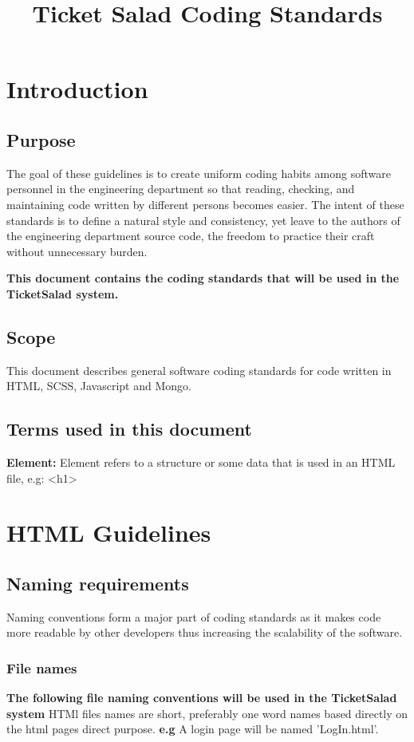 \documentclass[11pt]{article}
\begin{document}
	\title{Ticket Salad Coding Standards}
	\date{}
	\maketitle
	\tableofcontents
	\newpage
	
	\section{Introduction}
	\subsection{Purpose}
	The goal of these guidelines is to create uniform coding habits among software personnel in the
	engineering department so that reading, checking, and maintaining code written by different persons
	becomes easier. The intent of these standards is to define a natural style and consistency, yet leave
	to the authors of the engineering department source code, the freedom to practice their craft without
	unnecessary burden.
	
	
	\textbf{This document contains the coding standards that will be used in the TicketSalad system.}
	\subsection{Scope}
	This document describes general software coding standards for code written in HTML, SCSS, Javascript and Mongo.
	\subsection{Terms used in this document}
	\textbf{Element: }Element refers to a structure or some data that is used in an HTML file, e.g: <h1>
	\section{HTML Guidelines}
	\subsection{Naming requirements}
	Naming conventions form a major part of coding standards as it makes code more readable by other developers thus increasing the scalability of the software.
	\subsubsection{File names}
	\textbf{The following file naming conventions will be used in the TicketSalad system}
	\newline
	HTMl files names are short, preferably one word names based directly on the html pages direct purpose.
	\textbf{e.g} A login page will be named 'LogIn.html'. 
\end{document}
